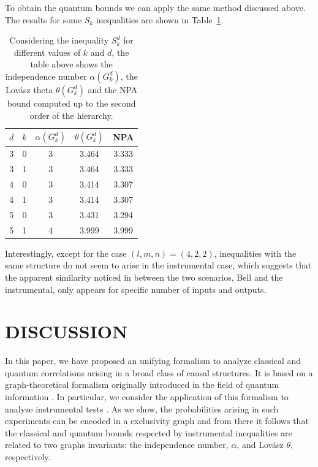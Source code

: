 \documentclass[letterpaper]{article}
\begin{document}
To obtain the quantum bounds we can apply the same method discussed above.
The results for some $S_k$ inequalities are shown in Table~\ref{tab:gclmps}.
\begin{table}
    \centering
    \begin{tabular}{ccccc}
        $d$ & $k$ & $\alpha(G^d_k)$ & $\theta(G^d_k)$ & NPA \\
        \toprule
         3 & 0 & 3 & 3.464 & 3.333 \\
         3 & 1 & 3 & 3.464 & 3.333 \\
         4 & 0 & 3 & 3.414 & 3.307 \\
         4 & 1 & 3 & 3.414 & 3.307 \\
         5 & 0 & 3 & 3.431 & 3.294 \\
         5 & 1 & 4 & 3.999 & 3.999 \\
    \end{tabular}
    \caption{Considering the inequality $S^d_k$ for different values of $k$ and $d$, the table above shows the independence number $\alpha(G^d_k)$, the Lov\'asz theta $\theta(G^d_k)$ and the NPA bound computed up to the second order of the hierarchy.}
    \label{tab:gclmps}
\end{table}

Interestingly, except for the case $(l,m,n) = (4,2,2)$, inequalities with the
same structure do not seem to arise in the instrumental case, which suggests
that the apparent similarity noticed in \cite{himbeeck2018} between the two scenarios, Bell and the
instrumental, only appears for specific number of inputs and outputs. 

\section{DISCUSSION}
In this paper, we have proposed an unifying formalism to analyze classical and
quantum correlations arising in a broad class of causal structures. It is based
on a graph-theoretical formalism originally introduced in the field of quantum
information \cite{cabello2014,rabelo2014,acin2015}. In particular, we consider
the application of this formalism to analyze instrumental tests
\cite{pearl1995}. As we show, the probabilities arising in such experiments can
be encoded in a exclusivity graph and from there it follows that the classical
and quantum bounds respected by instrumental inequalities are related to two
graphs invariants: the independence number, $\alpha$, and Lov\'asz $\theta$,
respectively.
\end{document}
